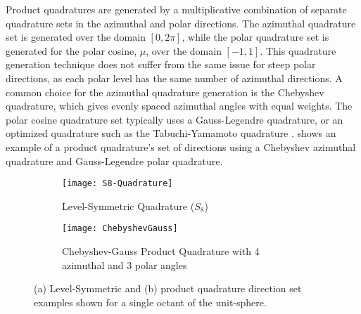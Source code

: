 {{{{{                  Product quadratures are generated by a multiplicative combination of separate quadrature sets in the azimuthal and polar directions.
                  The azimuthal quadrature set is generated over the domain $[0,2\pi]$, while the polar quadrature set is generated for the polar cosine, $\mu$, over the domain $[-1,1]$.
                  This quadrature generation technique does not suffer from the same issue for steep polar directions, as each polar level has the same number of azimuthal directions.
                  A common choice for the azimuthal quadrature generation is the Chebyshev quadrature, which gives evenly spaced azimuthal angles with equal weights.
                  The polar cosine quadrature set typically uses a Gauss-Legendre quadrature, or an optimized quadrature such as the Tabuchi-Yamamoto quadrature \cite{TabuchiYamamotoQuad}.
                   shows an example of a product quadrature's set of directions using a Chebyshev azimuthal quadrature and Gauss-Legendre polar quadrature.

                  \begin{figure}[h]
                      \centering
                      \begin{subfigure}[t]{0.45\linewidth}
                          \centering
                          \texttt{[image: S8-Quadrature]}
                          \caption{Level-Symmetric Quadrature ($S_8$)}
                          \label{fig:NTT:S8 Quadrature}
                      \end{subfigure}%
                      \hfill
                      \begin{subfigure}[t]{0.45\linewidth}
                          \centering
                          \texttt{[image: ChebyshevGauss]}
                          \caption{Chebyshev-Gauss Product Quadrature with 4 azimuthal and 3 polar angles}
                          \label{fig:NTT:ChebyshevGauss Quadrature}
                      \end{subfigure}
                      \caption{(a) Level-Symmetric and (b) product quadrature direction set examples shown for a single octant of the unit-sphere.}
                      \label{fig:NTT:Quadrature Examples}
                  \end{figure}
                }
            }
        }
    }
}
